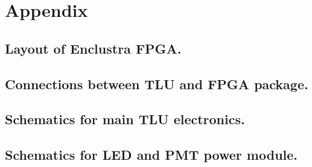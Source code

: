 \chapter{Appendix}\label{ch:appendix}
\section{Layout of Enclustra FPGA.}

\section{Connections between TLU and FPGA package.}

\section{Schematics for main TLU electronics.}
 
\section{Schematics for LED and PMT power module.}
 